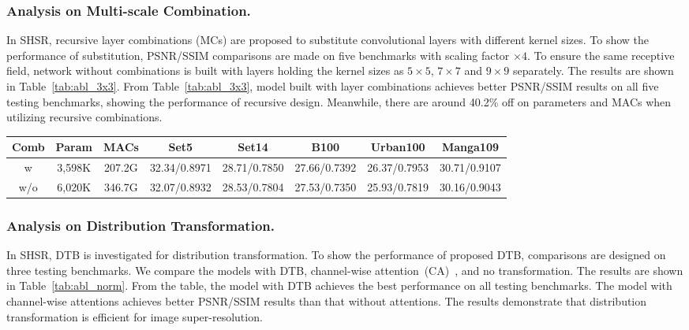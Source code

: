\documentclass[manuscript,screen]{acmart}
\begin{document}
\subsubsection{Analysis on Multi-scale Combination.}
In SHSR, recursive layer combinations (MCs) are proposed to substitute convolutional layers with different kernel sizes. To show the performance of substitution, PSNR/SSIM comparisons are made on five benchmarks with scaling factor $\times4$. To ensure the same receptive field, network without combinations is built with layers holding the kernel sizes as $5\times5$, $7\times7$ and $9\times9$ separately. The results are shown in Table~\ref{tab:abl_3x3}.
From Table~\ref{tab:abl_3x3}, model built with layer combinations achieves better PSNR/SSIM results on all five testing benchmarks, showing the performance of recursive design. Meanwhile, there are around 40.2\% off on parameters and MACs when utilizing recursive combinations. 

\begin{table*}
	\centering
	\caption{PSNR/SSIM results, parameters, and MACs of recursive combination in SMB with scaling factor $\times4$.}
	\label{tab:abl_3x3}
	\begin{tabular}{|c|c|c|c|c|c|c|c|}
		\hline  
		\textbf{Comb}&\textbf{Param}& \textbf{MACs}& \textbf{Set5}& \textbf{Set14}& \textbf{B100} &\textbf{Urban100}& \textbf{Manga109}\\
		\hline
		\hline
		{w}& 3,598K& 207.2G&32.34/0.8971& 28.71/0.7850& 27.66/0.7392& 26.37/0.7953& 30.71/0.9107\\ 
		{w/o}& 6,020K& 346.7G&32.07/0.8932& 28.53/0.7804& 27.53/0.7350& 25.93/0.7819& 30.16/0.9043\\
		\hline
	\end{tabular}
\end{table*}

\subsubsection{Analysis on Distribution Transformation.}
In SHSR, DTB is investigated for distribution transformation. To show the performance of proposed DTB, comparisons are designed on three testing benchmarks. We compare the models with DTB, channel-wise attention~(CA)~\cite{senet_pami2020}, and no transformation. The results are shown in Table~\ref{tab:abl_norm}.
From the table, the model with DTB achieves the best performance on all testing benchmarks. The model with channel-wise attentions achieves better PSNR/SSIM results than that without attentions. The results demonstrate that distribution transformation is efficient for image super-resolution.
\end{document}
